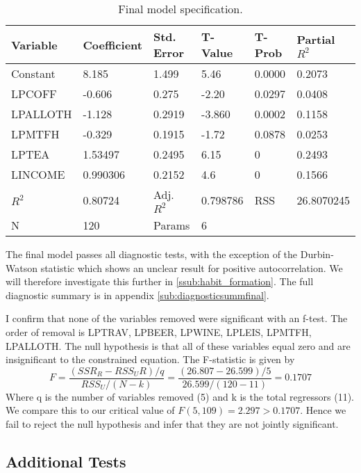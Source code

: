 \documentclass[12pt]{article}
\begin{document}
\begin{table}[!htb]\caption{\label{tb:finalmodel} Final model specification.}
	\centering
    \begin{tabular}{llllll}
    \textbf{Variable} & \textbf{Coefficient} & \textbf{Std. Error} & \textbf{T-Value} & \textbf{T-Prob} & \textbf{Partial \(R^2\)} \\ \hline\hline
    Constant & 8.185       & 1.499      & 5.46    & 0.0000 & 0.2073     \\
    LPCOFF   & -0.606      & 0.275      & -2.20   & 0.0297 & 0.0408     \\
    LPALLOTH & -1.128      & 0.2919     & -3.860  & 0.0002 & 0.1158     \\
    LPMTFH   & -0.329      & 0.1915     & -1.72   & 0.0878 & 0.0253     \\
    LPTEA    & 1.53497     & 0.2495     & 6.15    & 0      & 0.2493     \\
    LINCOME  & 0.990306    & 0.2152     & 4.6     & 0      & 0.1566     \\ \hline
	\(R^2\)  &    0.80724         & Adj. \(R^2\) &		0.798786  & RSS		& 	26.8070245		\\
	N		&		120		& Params	& 6
    \end{tabular}
\end{table} %
The final model passes all diagnostic tests, with the exception of the Durbin-Watson statistic which shows an unclear result for positive autocorrelation. We will therefore investigate this further in \ref{ssub:habit_formation}. The full diagnostic summary is in appendix \ref{sub:diagnosticsummfinal}.

I confirm that none of the variables removed were significant with an f-test. The order of removal is LPTRAV, LPBEER, LPWINE, LPLEIS, LPMTFH, LPALLOTH. The null hypothesis is that all of these variables equal zero and are insignificant to the constrained equation. The F-statistic is given by 
\[
F = \frac{(SSR_R - RSS_UR)/q}{RSS_U/(N-k)} = \frac{(26.807 - 26.599)/5}{26.599/(120-11)} = 0.1707
\]
Where q is the number of variables removed (5) and k is the total regressors (11). We compare this to our critical value of \(F(5,109) = 2.297 > 0.1707\). Hence we fail to reject the null hypothesis and infer that they are not jointly significant.


\subsection{Additional Tests} %
\label{sub:additional_tests}
\end{document}

